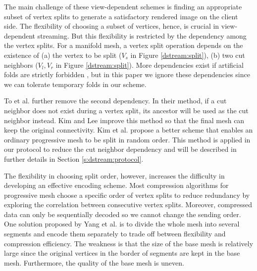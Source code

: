 \documentclass[11pt, a4paper]{report}
\begin{document}
    The main challenge of these view-dependent schemes is 
    finding an appropriate subset of vertex splits to generate a 
    satisfactory rendered image on the client side.
    The flexibility of choosing a subset of vertices,
    hence, is crucial in view-dependent streaming. But this flexibility is
    restricted by the dependency among the vertex splits.
    For a manifold mesh, a vertex split operation depends on the existence of (a)
    the vertex to be split ($V_s$ in Figure \ref{dstream:split}), (b) two
    cut neighbors ($V_l, V_r$ in Figure \ref{dstream:split}). More dependencies exist if artificial
    folds are strictly forbidden \cite{258843, 258847}, but in this paper we
    ignore these dependencies since we can tolerate temporary folds in our scheme.

     To et al. \cite{To1999} further remove the second dependency.
     In their method, if a cut neighbor does not exist during a vertex split,
     its ancestor will be used as the cut neighbor instead.
     Kim and Lee \cite{kim01truly} improve this method so that the final mesh
     can keep the original connectivity. 
     Kim et al. \cite{multiresolution:kim} propose a better scheme that enables
     an ordinary progressive mesh to be split in random order.
     This method is applied in our protocol to reduce the cut neighbor dependency
     and will be described in further details in Section \ref{s:dstream:protocol}.

     The flexibility in choosing split order, however, increases the difficulty
     in developing an effective encoding scheme. Most compression
     algorithms for progressive mesh %
     choose a specific order of vertex splits
     to reduce redundancy by exploring the correlation
     between consecutive vertex splits.
     Moreover, compressed data can only be sequentially decoded
     so we cannot change the sending order. One solution
     proposed by Yang et al. \cite{progressive:Yang}
     is to divide the whole mesh into several segments and encode them
     separately to trade off between flexibility and compression efficiency.
     The weakness is that the size of the base mesh is relatively large
     since the original vertices in the border of segments are kept in the base
     mesh. Furthermore, the quality of the base mesh is uneven.
\end{document}
